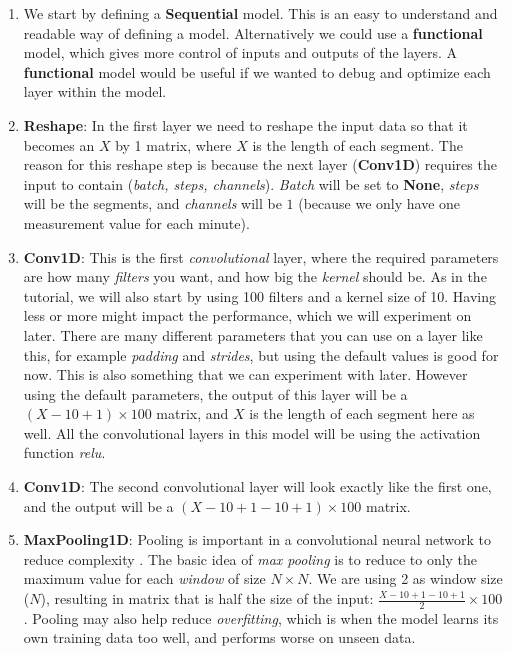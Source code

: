 \begin{enumerate}
  \item We start by defining a \textbf{Sequential} model. This is an easy to understand and readable way of defining a model. 
        Alternatively we could use a \textbf{functional} model, which gives more control of inputs and outputs of the layers.
        A \textbf{functional} model would be useful if we wanted to debug and optimize each layer within the model.
  \item \textbf{Reshape}: In the first layer we need to reshape the input data so that it becomes an $X$ by 1 matrix, where $X$ is the length of each segment.
        The reason for this reshape step is because the next layer (\textbf{Conv1D}) requires the input to contain (\textit{batch, steps, channels}). 
        \textit{Batch} will be set to \textbf{None}, \textit{steps} will be the segments, and \textit{channels} will be $1$ 
        (because we only have one measurement value for each minute).
  \item \textbf{Conv1D}: This is the first \textit{convolutional} layer, where the required parameters are how many \textit{filters} 
        you want, and how big the \textit{kernel} should be. As in the tutorial, we will also start by using 100 filters and a kernel size of 10. 
        Having less or more might impact the performance, which we will experiment on later.
        There are many different parameters that you can use on a layer like this, for example \textit{padding} and \textit{strides},
        but using the default values is good for now. This is also something that we can experiment with later.
        However using the default parameters, the output of this layer will be a $(X-10+1) \times 100$ matrix, 
        and $X$ is the length of each segment here as well. All the convolutional layers in this model will be using the activation function \textit{relu}.
  \item \textbf{Conv1D}: The second convolutional layer will look exactly like the first one, and the output will be a $(X-10+1-10+1) \times 100$ matrix. 
  \item \textbf{MaxPooling1D}: Pooling is important in a convolutional neural network to reduce complexity \cite{1d_cnn}. 
        The basic idea of \textit{max pooling} is to reduce to only the maximum value for each \textit{window} of size $N \times N$. We are using 2 as 
        window size ($N$), resulting in matrix that is half the size of the input: $ \frac{X-10+1-10+1}{2} \times 100$. 
        Pooling may also help reduce \textit{overfitting}, which is when the model learns its own training data too well, and performs worse on unseen data.

\end{enumerate}
